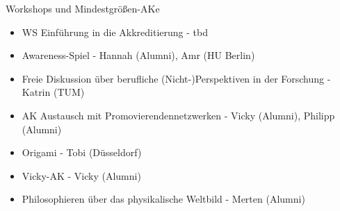 \begin{frame}{Workshops und Mindestgrößen-AKe}
	\begin{itemize}
		\item WS Einführung in die Akkreditierung - tbd
		\item Awareness-Spiel - Hannah (Alumni), Amr (HU Berlin)
	\end{itemize}
	\vspace{.5 cm}
	\begin{itemize}
		\item Freie Diskussion über berufliche (Nicht-)Perspektiven in der Forschung - Katrin (TUM)
		\item AK Austausch mit Promovierendennetzwerken - Vicky (Alumni), Philipp (Alumni)
		\item Origami - Tobi (Düsseldorf)
		\item Vicky-AK - Vicky (Alumni)
		\item Philosophieren über das physikalische Weltbild - Merten (Alumni)
	\end{itemize}
\end{frame}